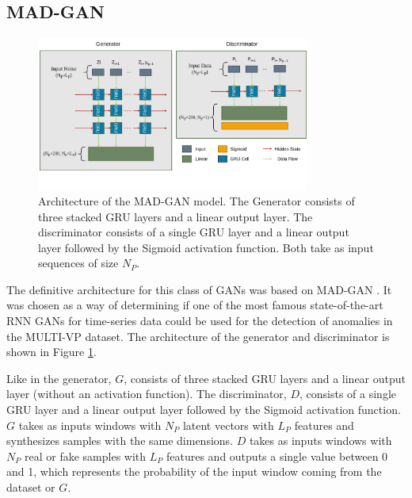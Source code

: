\subsection{MAD-GAN}\label{sec:madgan}

\begin{figure}
    \centering
    \includegraphics[width=0.8\textwidth]{figures/madgan_arch.png}
    \caption[MAD-GAN Architecture]{Architecture of the MAD-GAN model. The Generator consists of three stacked GRU layers and a linear output layer. The discriminator consists of a single GRU layer and a linear output layer followed by the Sigmoid activation function. Both take as input sequences of size $N_P$.}
    \label{fig:madgan_architecture}
\end{figure}

The definitive architecture for this class of GANs was based on MAD-GAN \cite{li.etal_MADGANMultivariateAnomaly_2019}. It was chosen as a way of determining if one of the most famous state-of-the-art RNN GANs for time-series data could be used for the detection of anomalies in the MULTI-VP dataset. The architecture of the generator and discriminator is shown in Figure \ref{fig:madgan_architecture}.

Like in \cite{li.etal_MADGANMultivariateAnomaly_2019} the generator, $G$, consists of three stacked GRU layers and a linear output layer (without an activation function). The discriminator, $D$, consists of a single GRU layer and a linear output layer followed by the Sigmoid activation function. $G$ takes as inputs windows with $N_P$ latent vectors with $L_P$ features and synthesizes samples with the same dimensions. $D$ takes as inputs windows with $N_P$ real or fake samples with $L_P$ features and outputs a single value between 0 and 1, which represents the probability of the input window coming from the dataset or $G$.

